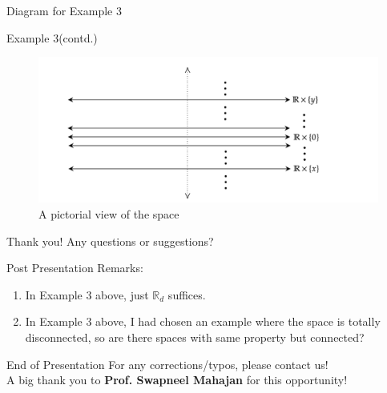 \documentclass{beamer}
\newcommand{\R}{\mathbb{R}}
\begin{document}
\begin{frame}{Diagram for Example 3}
\begin{block}{Example 3(contd.)}
\begin{figure}
    \centering
    \includegraphics[width = 1.1\textwidth]{diag-4.png}
    \caption{A pictorial view of the space}
\end{figure}
\end{block}
\end{frame}
\begin{frame}{Thank you!}
    Any questions or suggestions?
    
    \alert{Post Presentation Remarks:} \\
    \begin{enumerate}
        \item In Example 3 above, just $\R_{d}$ suffices.
        \item In Example 3 above, I had chosen an example where the space is totally disconnected, so are there spaces with same property but connected? 
    \end{enumerate}
\end{frame}


\begin{frame}{End of Presentation}
        For any corrections/typos, please contact us!\\
        A \alert{big thank you} to \textbf{Prof. Swapneel Mahajan} for this opportunity!
        
    \end{frame}
\end{document}
